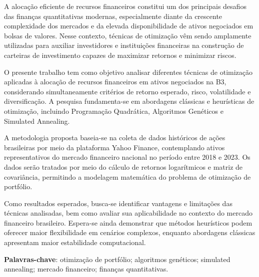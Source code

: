 ﻿\documentclass[
  12pt,
  oneside,
  a4paper,
  brazil
]{abntex2}
\begin{document}
\imprimircapa

\begin{resumo}
A alocação eficiente de recursos financeiros constitui um dos principais desafios das finanças quantitativas modernas, especialmente diante da crescente complexidade dos mercados e da elevada disponibilidade de ativos negociados em bolsas de valores. Nesse contexto, técnicas de otimização vêm sendo amplamente utilizadas para auxiliar investidores e instituições financeiras na construção de carteiras de investimento capazes de maximizar retornos e minimizar riscos.

O presente trabalho tem como objetivo analisar diferentes técnicas de otimização aplicadas à alocação de recursos financeiros em ativos negociados na B3, considerando simultaneamente critérios de retorno esperado, risco, volatilidade e diversificação. A pesquisa fundamenta-se em abordagens clássicas e heurísticas de otimização, incluindo Programação Quadrática, Algoritmos Genéticos e Simulated Annealing.

A metodologia proposta baseia-se na coleta de dados históricos de ações brasileiras por meio da plataforma Yahoo Finance, contemplando ativos representativos do mercado financeiro nacional no período entre 2018 e 2023. Os dados serão tratados por meio do cálculo de retornos logarítmicos e matriz de covariância, permitindo a modelagem matemática do problema de otimização de portfólio.

Como resultados esperados, busca-se identificar vantagens e limitações das técnicas analisadas, bem como avaliar sua aplicabilidade no contexto do mercado financeiro brasileiro. Espera-se ainda demonstrar que métodos heurísticos podem oferecer maior flexibilidade em cenários complexos, enquanto abordagens clássicas apresentam maior estabilidade computacional.

\textbf{Palavras-chave}: otimização de portfólio; algoritmos genéticos; simulated annealing; mercado financeiro; finanças quantitativas.
\end{resumo}
\end{document}
